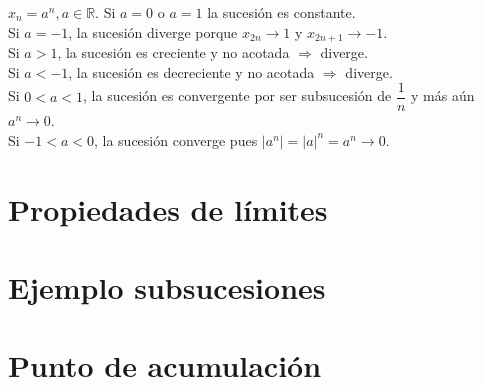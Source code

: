 \begin{eg}
  $x_n = a^n, a \in \mathbb{R}$. Si $a=0$ o $a = 1$ la sucesión es constante. \\
  Si $a = -1$, la sucesión diverge porque $x_{2n} \to 1$ y $x_{2n+1} \to -1$. \\
  Si $a > 1$, la sucesión es creciente y no acotada $\Rightarrow$ diverge. \\
  Si $a < -1$, la sucesión es decreciente y no acotada $\Rightarrow$ diverge. \\
  Si $0 < a < 1$, la sucesión es convergente por ser subsucesión de $\dfrac{1}{n}$ y más aún $a^n \to 0$. \\
  Si $-1 < a < 0$, la sucesión converge pues $|a^n| = |a|^n = a^n \to 0$.
\end{eg}

\section{Propiedades de límites}

\section{Ejemplo subsucesiones}

\section{Punto de acumulación}

